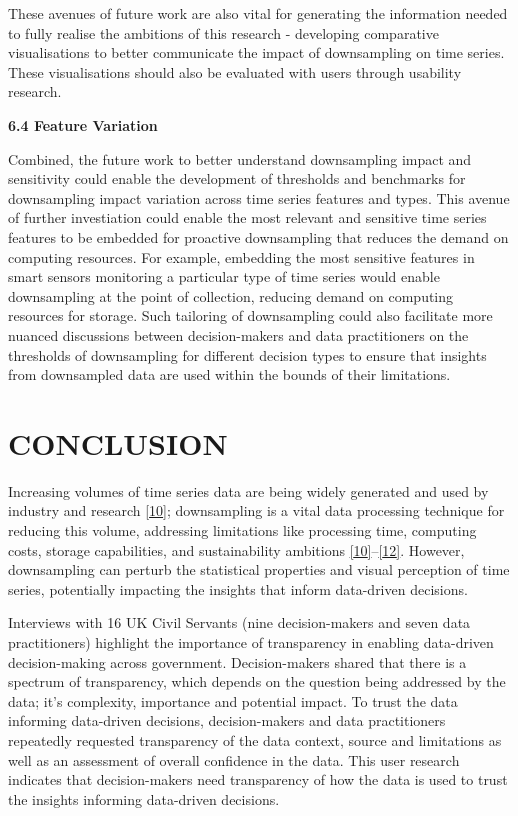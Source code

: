 \documentclass{article}
\begin{document}
These avenues of future work are also vital for generating the
information needed to fully realise the ambitions of this research -
developing comparative visualisations to better communicate the impact
of downsampling on time series. These visualisations should also be
evaluated with users through usability research.

\textbf{6.4 Feature Variation}

Combined, the future work to better understand downsampling impact and
sensitivity could enable the development of thresholds and benchmarks
for downsampling impact variation across time series features and types.
This avenue of further investiation could enable the most relevant and
sensitive time series features to be embedded for proactive downsampling
that reduces the demand on computing resources. For example, embedding
the most sensitive features in smart sensors monitoring a particular
type of time series would enable downsampling at the point of
collection, reducing demand on computing resources for storage. Such
tailoring of downsampling could also facilitate more nuanced discussions
between decision-makers and data practitioners on the thresholds of
downsampling for different decision types to ensure that insights from
downsampled data are used within the bounds of their limitations.

\hypertarget{conclusion}{%
\section{CONCLUSION}\label{conclusion}}

Increasing volumes of time series data are being widely generated and
used by industry and research \protect\hyperlink{ref-TVStore}{{[}10{]}};
downsampling is a vital data processing technique for reducing this
volume, addressing limitations like processing time, computing costs,
storage capabilities, and sustainability ambitions
\protect\hyperlink{ref-TVStore}{{[}10{]}}--\protect\hyperlink{ref-Shift}{{[}12{]}}.
However, downsampling can perturb the statistical properties and visual
perception of time series, potentially impacting the insights that
inform data-driven decisions.

Interviews with 16 UK Civil Servants (nine decision-makers and seven
data practitioners) highlight the importance of transparency in enabling
data-driven decision-making across government. Decision-makers shared
that there is a spectrum of transparency, which depends on the question
being addressed by the data; it's complexity, importance and potential
impact. To trust the data informing data-driven decisions,
decision-makers and data practitioners repeatedly requested transparency
of the data context, source and limitations as well as an assessment of
overall confidence in the data. This user research indicates that
decision-makers need transparency of how the data is used to trust the
insights informing data-driven decisions.
\end{document}
